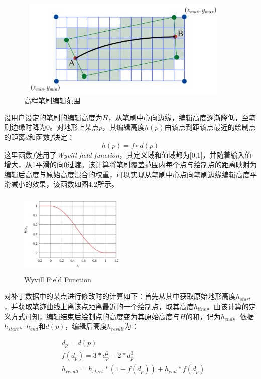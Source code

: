 \begin{figure}[ht]
    \centering
    \includegraphics[height=4.7cm ,width=10.45cm]{figures/editArea.jpg}
  \caption{高程笔刷编辑范围}
  \end{figure}
设用户设定的笔刷的编辑高度为$H$，从笔刷中心向边缘，编辑高度逐渐降低，至笔刷边缘时降为0。对地形上某点$p$，其编辑高度$h(p)$由该点到距该点最近的绘制点的距离$d$和函数$f$决定：
\begin{equation}
h(p) = f \circ d(p)
\end{equation}
这里函数$f$选用了\textit{Wyvill field function}\supercite{wyvill}，其定义域和值域都为[0,1]，并随着输入值增大，从1平滑的向0过渡。该计算将笔刷覆盖范围内每个点与绘制点的距离映射为编辑后高度与原始高度混合的权重，可以实现从笔刷中心点向笔刷边缘编辑高度平滑减小的效果，该函数如图4.2所示。\par
\begin{figure}[ht]
\centering
\includegraphics[height=4cm        ,width=5cm]{figures/Wyvill-field-function.jpg}
\caption{Wyvill Field Function\supercite{wyvill}}
\end{figure}
对补丁数据中的某点进行修改时的计算如下：首先从其中获取原始地形高度$h_{start}$，并获取笔迹曲线上离该点距离最近的一个绘制点，取其高度$h_{line}$。由该计算的定义方式可知，编辑结束后绘制点的高度变为其原始高度与$H$的和，记为$h_{end}$。依据$h_{start}$、$h_{end}$和$d(p)$，编辑后高度$h_{result}$为：\par
\begin{equation}
\begin{aligned}
&  d_p=d(p)\\
& f(d_p) = 3 * d_p^2 - 2 * d_p^3\\
&h_{result}=h_{start} * (1 - f(d_p)) + h_{end} * f(d_p)
\end{aligned}
\end{equation}
